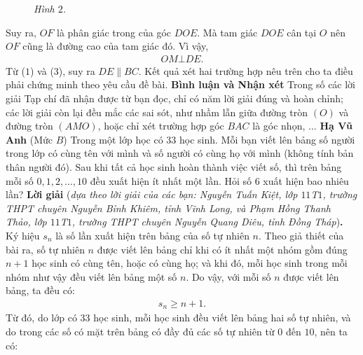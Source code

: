 \begin{multicols}{2}
\begin{figure}[H]
		\caption{\small\textit{\color{thachthuctoanhoc}Hình $2$.}}
		\vspace*{-10pt}
	\end{figure}
	Suy ra, $OF$ là phân giác trong của góc $DOE$. Mà tam giác $DOE$ cân tại $O$ nên $OF$ cũng là đường cao của tam giác đó. Vì vậy,
	\begin{align*}
		OM \bot DE. \tag{$3$}
	\end{align*}
	Từ ($1$) và ($3$), suy ra $DE \parallel BC$.
	\vskip 0.05cm
	Kết quả xét hai trường hợp nêu trên cho ta điều phải chứng minh theo yêu cầu đề bài.
	\vskip 0.05cm
	\textbf{\color{thachthuctoanhoc}Bình luận và Nhận xét}
	\vskip 0.05cm
	Trong số các lời giải Tạp chí đã nhận được từ bạn đọc, chỉ có năm lời giải đúng và hoàn chỉnh; các lời giải còn lại đều mắc các sai sót, như nhầm lẫn giữa đường tròn $(O)$ và đường tròn $(AMO)$, hoặc chỉ xét trường hợp góc $BAC$ là góc nhọn, $\ldots$
	\vskip 0.15cm
	\hfill	\textbf{\color{thachthuctoanhoc}Hạ Vũ Anh}
	\vskip 0.15cm
	{}
	(Mức $B$) Trong một lớp học có $33$ học sinh. Mỗi bạn viết lên bảng số người trong lớp có cùng tên với mình và số người có cùng họ với mình (không tính bản thân người đó). Sau khi tất cả học sinh hoàn thành việc viết số, thì trên bảng mỗi số $0,1,2,\ldots,10$ đều xuất hiện ít nhất một lần. Hỏi số $6$ xuất hiện bao nhiêu lần?
	\vskip 0.05cm
	\textbf{\color{thachthuctoanhoc}Lời giải} (\textit{dựa theo lời giải của các bạn: Nguyễn Tuấn Kiệt, lớp $11$T$1$, trường THPT chuyên Nguyễn Bỉnh Khiêm, tỉnh Vĩnh Long, và Phạm Hồng Thanh Thảo, lớp $11$T$1$, trường THPT chuyên Nguyễn Quang Diêu, tỉnh Đồng Tháp})\textbf{\color{thachthuctoanhoc}.}
	\vskip 0.05cm
	Ký hiệu $s_n$  là số lần xuất hiện trên bảng của số tự nhiên $n$.
	\vskip 0.05cm
	Theo giả thiết của bài ra, số tự nhiên $n$ được viết lên bảng chỉ khi có ít nhất một nhóm gồm đúng $n + 1$ học sinh có cùng tên, hoặc có cùng họ; và khi đó, mỗi học sinh trong mỗi nhóm như vậy đều viết lên bảng một số $n$. Do vậy, với mỗi số $n$ được viết lên bảng, ta đều có:
	\begin{align*}
		{s_n} \ge n + 1.
	\end{align*}
	Từ đó, do lớp có $33$ học sinh, mỗi học sinh đều viết lên bảng hai số tự nhiên, và do trong các số có mặt trên bảng có đầy đủ các số tự nhiên từ $0$ đến $10$, nên ta có:

\end{multicols}
